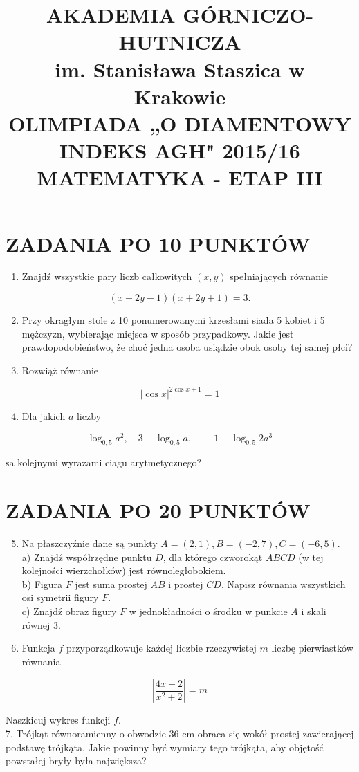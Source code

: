 \documentclass[10pt]{article}
\title{AKADEMIA GÓRNICZO-HUTNICZA \\
 im. Stanisława Staszica w Krakowie \\
 OLIMPIADA „O DIAMENTOWY INDEKS AGH" 2015/16 \\
 MATEMATYKA - ETAP III }
\author{}
\date{}
\begin{document}
\maketitle
\section*{ZADANIA PO 10 PUNKTÓW}
\begin{enumerate}
  \item Znajdź wszystkie pary liczb całkowitych $(x, y)$ spełniających równanie
\end{enumerate}

$$
(x-2 y-1)(x+2 y+1)=3 .
$$

\begin{enumerate}
  \setcounter{enumi}{1}
  \item Przy okragłym stole z 10 ponumerowanymi krzesłami siada 5 kobiet i 5 mężczyzn, wybierając miejsca w sposób przypadkowy. Jakie jest prawdopodobieństwo, że choć jedna osoba usiądzie obok osoby tej samej płci?
  \item Rozwiąż równanie
\end{enumerate}

$$
|\cos x|^{2 \cos x+1}=1
$$

\begin{enumerate}
  \setcounter{enumi}{3}
  \item Dla jakich $a$ liczby
\end{enumerate}

$$
\log _{0,5} a^{2}, \quad 3+\log _{0,5} a, \quad-1-\log _{0,5} 2 a^{3}
$$

sa kolejnymi wyrazami ciagu arytmetycznego?

\section*{ZADANIA PO 20 PUNKTÓW}
\begin{enumerate}
  \setcounter{enumi}{4}
  \item Na płaszczyźnie dane są punkty $A=(2,1), B=(-2,7), C=(-6,5)$.\\
a) Znajdź współrzędne punktu $D$, dla którego czworokąt $A B C D$ (w tej kolejności wierzchołków) jest równoległobokiem.\\
b) Figura $F$ jest suma prostej $A B$ i prostej $C D$. Napisz równania wszystkich osi symetrii figury $F$.\\
c) Znajdź obraz figury $F$ w jednokładności o środku w punkcie $A$ i skali równej 3.
  \item Funkcja $f$ przyporządkowuje każdej liczbie rzeczywistej $m$ liczbę pierwiastków równania
\end{enumerate}

$$
\left|\frac{4 x+2}{x^{2}+2}\right|=m
$$

Naszkicuj wykres funkcji $f$.\\
7. Trójkąt równoramienny o obwodzie 36 cm obraca się wokół prostej zawierającej podstawę trójkąta. Jakie powinny być wymiary tego trójkąta, aby objętość powstałej bryły była największa?
\end{document}
